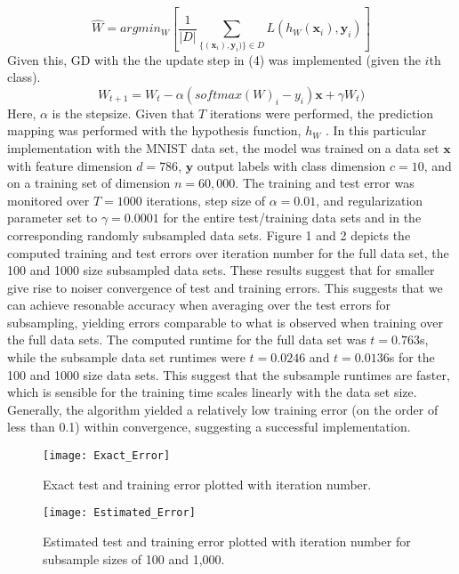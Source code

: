 \documentclass{article}
\begin{document}
 \begin{equation}
\hat{W}= argmin_{W}    [ \frac{1}{|D|} \sum_{\{( \mathbf{x}_{i} ),\mathbf{y}_{i}) \} \in D } L(h_{W} (\mathbf{x}_{i} ),\mathbf{y}_{i}) ] 
\end{equation}
 Given this, GD with the the update step in (4) was implemented (given the $i$th class). 
  \begin{equation}
  W_{t+1} = W_{t} -\alpha ( softmax(W)_{i} - y_{i})\mathbf{x} + \gamma W_{t})
  \end{equation}
Here, $\alpha$ is the stepsize. Given that $T$ iterations were performed, the prediction mapping was performed with the hypothesis function, $h_{W}$ . In this particular implementation with the MNIST data set, the model was trained on a data set $\mathbf{x}$ with feature dimension $d=786$, $\mathbf{y}$ output labels with class dimension $c=10$, and on a training set of dimension $n=60,000$. The training and test error was monitored over $T=1000$ iterations, step size of $\alpha=0.01$, and regularization parameter set to $\gamma = 0.0001$ for the entire test/training data sets and in the corresponding randomly subsampled data sets. Figure 1 and 2 depicts the computed training and test errors over iteration number for the full data set, the 100 and 1000 size subsampled data sets. These results suggest that for smaller give rise to noiser convergence of test and training errors. This suggests that we can achieve resonable accuracy when averaging over the test errors for subsampling, yielding errors comparable to what is observed when training over the full data sets. The computed runtime for the full data set was $t=0.763$s,  while the subsample data set runtimes were $t=0.0246$ and $t = 0.0136$s for the 100 and 1000 size data sets.  This suggest that the subsample runtimes are faster, which is sensible for the training time scales linearly with the data set size. Generally, the algorithm yielded a relatively low training error (on the order of less than 0.1) within convergence, suggesting a successful implementation.  
\begin{figure}[h]
\caption{Exact test and training error plotted with iteration number. }
\centering
\texttt{[image: Exact\_Error]}
\end{figure}
 
 \begin{figure}[h]
\caption{Estimated test and training error plotted with iteration number for subsample sizes of 100 and 1,000. }
\centering
\texttt{[image: Estimated\_Error]}
\end{figure}
 
\end{document}
